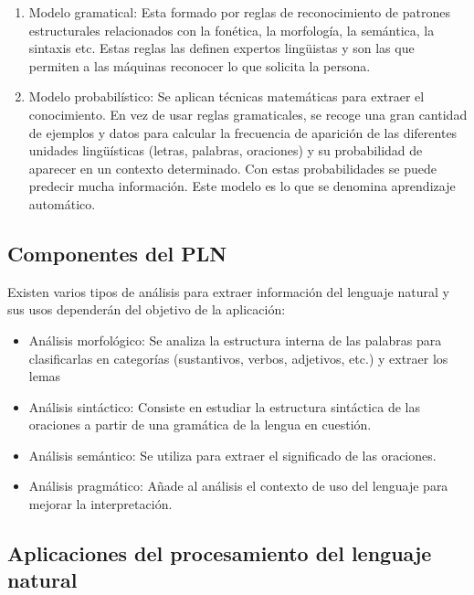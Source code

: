 \begin{enumerate}
	\item Modelo gramatical: Esta formado por reglas de reconocimiento de patrones estructurales relacionados con la fonética, la morfología, la semántica, la sintaxis etc. Estas reglas las definen expertos lingüistas y son las que permiten a las máquinas reconocer lo que solicita la persona.
	\item Modelo probabilístico: Se aplican técnicas matemáticas para extraer el conocimiento. En vez de usar reglas gramaticales, se recoge una gran cantidad de ejemplos y datos para calcular la frecuencia de aparición de las diferentes unidades lingüísticas (letras, palabras, oraciones) y su probabilidad de aparecer en un contexto determinado. Con estas probabilidades se puede predecir mucha información. Este modelo es lo que se denomina aprendizaje automático.
\end{enumerate}

\subsection{Componentes del PLN}

Existen varios tipos de análisis para extraer información del lenguaje natural y sus usos dependerán del objetivo de la aplicación:

\begin{itemize}
	\item Análisis morfológico: Se analiza la estructura interna de las palabras para clasificarlas en categorías (sustantivos, verbos, adjetivos, etc.) y extraer los lemas 
	
	\item Análisis sintáctico: Consiste en estudiar la estructura sintáctica de las oraciones a partir de una gramática de la lengua en cuestión.
	
	\item Análisis semántico: Se utiliza para extraer el significado de las oraciones.
	
	\item Análisis pragmático: Añade al análisis el contexto de uso del lenguaje para mejorar la interpretación.
\end{itemize}



\subsection{Aplicaciones del procesamiento del lenguaje natural}

